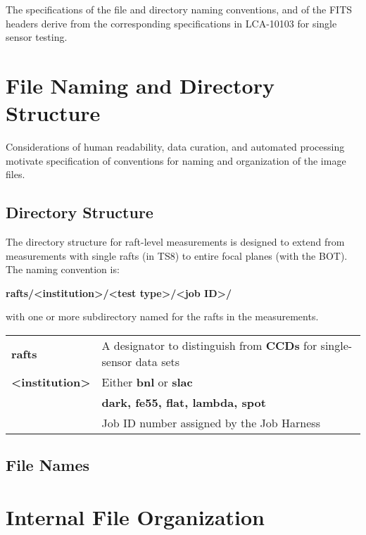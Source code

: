 \documentclass{article}[12pt]
\begin{document}
The specifications of the file and directory naming conventions, and of the FITS headers derive from the corresponding specifications in LCA-10103 for single sensor testing.

\section{File Naming and Directory Structure}
Considerations of human readability, data curation, and automated processing motivate specification of conventions for naming and organization of the image files.

\subsection{Directory Structure}

The directory structure for raft-level measurements is designed to extend from measurements with single rafts (in TS8) to entire focal planes (with the BOT).  The naming convention is:

{\bf rafts/<institution>/<test type>/<job ID>/}

with one or more subdirectory named for the rafts in the measurements.  

\begin{tabular}{| l | l |}
\hline
{\bf rafts} & A designator to distinguish from {\bf CCDs} for single-sensor data sets \\
{\bf <institution>} & Either {\bf bnl} or {\bf slac} \\
{\bf <test type>} & {\bf dark, fe55, flat, lambda, spot} \\
{\bf <job ID>} & Job ID number assigned by the Job Harness \\
\hline
\end{tabular}

\subsection{File Names}

\section{Internal File Organization}
\end{document}
